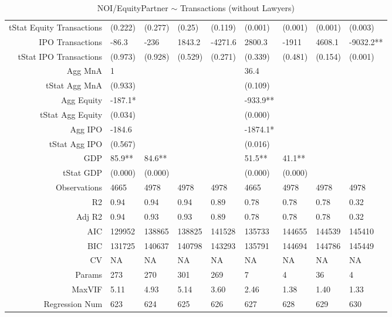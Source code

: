 \begin{table}[ht]
\begin{tabular}{rllllllll}
  tStat Equity Transactions & (0.222) & (0.277) & (0.25) & (0.119) & (0.001) & (0.001) & (0.001) & (0.003) \\ 
  IPO Transactions & -86.3 & -236 & 1843.2 & -4271.6 & 2800.3 & -1911 & 4608.1 & -9032.2** \\ 
  tStat IPO Transactions & (0.973) & (0.928) & (0.529) & (0.271) & (0.339) & (0.481) & (0.154) & (0.001) \\ 
  Agg MnA & 1 &  &  &  & 36.4 &  &  &  \\ 
  tStat Agg MnA & (0.933) &  &  &  & (0.109) &  &  &  \\ 
  Agg Equity & -187.1* &  &  &  & -933.9** &  &  &  \\ 
  tStat Agg Equity & (0.034) &  &  &  & (0.000) &  &  &  \\ 
  Agg IPO & -184.6 &  &  &  & -1874.1* &  &  &  \\ 
  tStat Agg IPO & (0.567) &  &  &  & (0.016) &  &  &  \\ 
  GDP & 85.9** & 84.6** &  &  & 51.5** & 41.1** &  &  \\ 
  tStat GDP & (0.000) & (0.000) &  &  & (0.000) & (0.000) &  &  \\ 
  Observations & 4665 & 4978 & 4978 & 4978 & 4665 & 4978 & 4978 & 4978 \\ 
  R2 & 0.94 & 0.94 & 0.94 & 0.89 & 0.78 & 0.78 & 0.78 & 0.32 \\ 
  Adj R2 & 0.94 & 0.93 & 0.93 & 0.89 & 0.78 & 0.78 & 0.78 & 0.32 \\ 
  AIC & 129952 & 138865 & 138825 & 141528 & 135733 & 144655 & 144539 & 145410 \\ 
  BIC & 131725 & 140637 & 140798 & 143293 & 135791 & 144694 & 144786 & 145449 \\ 
  CV & NA & NA & NA & NA & NA & NA & NA & NA \\ 
  Params & 273 & 270 & 301 & 269 & 7 & 4 & 36 & 4 \\ 
  MaxVIF & 5.11 & 4.93 & 5.14 & 3.60 & 2.46 & 1.38 & 1.40 & 1.33 \\ 
  Regression Num & 623 & 624 & 625 & 626 & 627 & 628 & 629 & 630 \\ 
   \hline
\end{tabular}
\caption{NOI/EquityPartner $\sim$ Transactions (without Lawyers)} 
\end{table}
